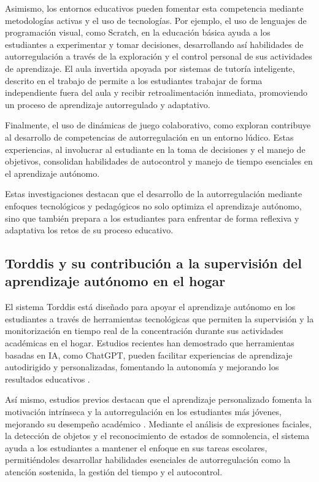 \documentclass[a4paper,fleqn]{cas-sc}
\begin{document}
			Asimismo, los entornos educativos pueden fomentar esta competencia mediante metodologías activas y el uso de tecnologías. Por ejemplo, el uso de lenguajes de programación visual, como Scratch, en la educación básica ayuda a los estudiantes a experimentar y tomar decisiones, desarrollando así habilidades de autorregulación a través de la exploración y el control personal de sus actividades de aprendizaje. El aula invertida apoyada por sistemas de tutoría inteligente, descrito en el trabajo de \cite{Mohamed2018Implementing} permite a los estudiantes trabajar de forma independiente fuera del aula y recibir retroalimentación inmediata, promoviendo un proceso de aprendizaje autorregulado y adaptativo.
			
			Finalmente, el uso de dinámicas de juego colaborativo, como  exploran \cite{Echeverria2011AFramework} contribuye al desarrollo de competencias de autorregulación en un entorno lúdico. Estas experiencias, al involucrar al estudiante en la toma de decisiones y el manejo de objetivos, consolidan habilidades de autocontrol y manejo de tiempo esenciales en el aprendizaje autónomo.
			
			Estas investigaciones destacan que el desarrollo de la autorregulación mediante enfoques tecnológicos y pedagógicos no solo optimiza el aprendizaje autónomo, sino que también prepara a los estudiantes para enfrentar de forma reflexiva y adaptativa los retos de su proceso educativo.
			
		\subsection{Torddis y su contribución a la supervisión del aprendizaje autónomo en el hogar}		
			El sistema Torddis está diseñado para apoyar el aprendizaje autónomo en los estudiantes a través de herramientas tecnológicas que permiten la supervisión y la monitorización en tiempo real de la concentración durante sus actividades académicas en el hogar. Estudios recientes han demostrado que herramientas basadas en IA, como ChatGPT, pueden facilitar experiencias de aprendizaje autodirigido y personalizadas, fomentando la autonomía y mejorando los resultados educativos \cite{Li2024Systematic}.
			
			Así mismo, estudios previos destacan que el aprendizaje personalizado fomenta la motivación intrínseca y la autorregulación en los estudiantes más jóvenes, mejorando su desempeño académico \cite{Ackermans2025Young}. Mediante el análisis de expresiones faciales, la detección de objetos y el reconocimiento de estados de somnolencia, el sistema ayuda a los estudiantes a mantener el enfoque en sus tareas escolares, permitiéndoles desarrollar habilidades esenciales de autorregulación como la atención sostenida, la gestión del tiempo y el autocontrol.
			
\end{document}
